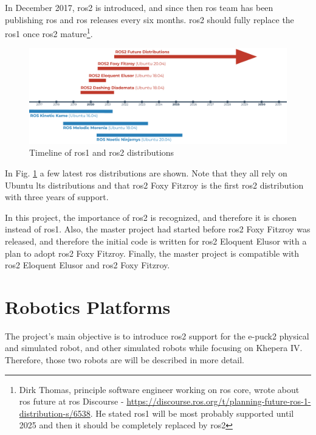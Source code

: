 In December 2017, \ac{ros2} is introduced, and since then \ac{ros} team has been publishing \ac{ros} and \ac{ros} releases every six months.
\ac{ros2} should fully replace the \ac{ros1} once \ac{ros2} mature\footnote{Dirk Thomas, principle software engineer working on \ac{ros} core, wrote about \ac{ros} future at \ac{ros} Discourse -  \url{https://discourse.ros.org/t/planning-future-ros-1-distribution-s/6538}. He stated \ac{ros1} will be most probably supported until 2025 and then it should be completely replaced by \ac{ros2}}.

\begin{figure}[H]
    \centering
    \includegraphics[width=\textwidth]{background/figures/ros_distributions}
    \caption{Timeline of \ac{ros1} and \ac{ros2} distributions}
    \label{fig:background:ros_distributions}
\end{figure}

In Fig. \ref{fig:background:ros_distributions} a few latest \ac{ros} distributions are shown.
Note that they all rely on Ubuntu \ac{lts} distributions and that \ac{ros2} Foxy Fitzroy is the first \ac{ros2} distribution with three years of support.

In this project, the importance of \ac{ros2} is recognized, and therefore it is chosen instead of \ac{ros1}.
Also, the master project had started before \ac{ros2} Foxy Fitzroy was released, and therefore the initial code is written for \ac{ros2} Eloquent Elusor with a plan to adopt \ac{ros2} Foxy Fitzroy.
Finally, the master project is compatible with \ac{ros2} Eloquent Elusor and \ac{ros2} Foxy Fitzroy.

\section{Robotics Platforms}
The project's main objective is to introduce \ac{ros2} support for the e-puck2 physical and simulated robot, and other simulated robots while focusing on Khepera IV.
Therefore, those two robots are will be described in more detail.

